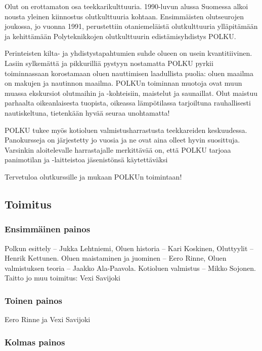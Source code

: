 \documentclass[a4paper,11pt]{report}
\begin{document}
Olut on erottamaton osa teekkarikulttuuria. 1990-luvun alussa Suomessa alkoi nousta yleinen kiinnostus olutkulttuuria kohtaan. Ensimmäisten olutseurojen joukossa, jo vuonna 1991, perustettiin otaniemeläistä olutkulttuuria ylläpitämään ja kehittämään Polyteknikkojen olutkulttuurin edistämisyhdistys POLKU. 

Perinteisten kilta- ja yhdistystapahtumien suhde olueen on usein kvantitiivinen. Lasiin sylkemättä ja pikkurilliä pystyyn nostamatta POLKU pyrkii toiminnassaan korostamaan oluen nauttimisen laadullista puolia: oluen maailma on makujen ja nautinnon maailma. POLKUn toiminnan muotoja ovat muun muassa ekskursiot olutmaihin ja -kohteisiin, maistelut ja saunaillat. Olut maistuu parhaalta oikeanlaisesta tuopista, oikeassa lämpötilassa tarjoiltuna rauhallisesti nautiskeltuna, tietenkään hyvää seuraa unohtamatta!

POLKU tukee myös kotioluen valmistusharrastusta teekkareiden keskuudessa. Panokursseja on järjestetty jo vuosia ja ne ovat aina olleet hyvin suosittuja. Varsinkin aloitelevalle harrastajalle merkittävää on, että POLKU tarjoaa panimotilan ja -laitteistoa jäsenistönsä käytettäväksi

Tervetuloa olutkurssille ja mukaan POLKUn toimintaan!

\subsection*{Toimitus}

\subsubsection*{Ensimmäinen painos}

Polkun esittely -- Jukka Lehtniemi, Oluen historia -- Kari Koskinen, Oluttyylit -- Henrik Kettunen. Oluen maistaminen ja juominen -- Eero Rinne, Oluen valmistuksen teoria -- Jaakko Ala-Paavola. Kotioluen valmistus -- Mikko Sojonen. Taitto jo muu toimitus: Vexi Savijoki

\subsubsection*{Toinen painos}

Eero Rinne ja Vexi Savijoki

\subsubsection*{Kolmas painos}
\end{document}
